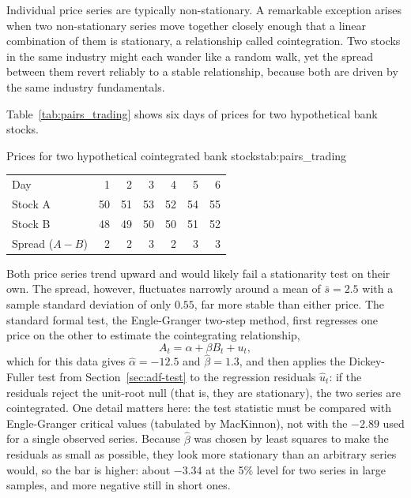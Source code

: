 \documentclass[../ai_in_finance]{subfiles}
\begin{document}
Individual price series are typically non-stationary. A remarkable exception arises when two non-stationary series move together closely enough that a linear combination of them is stationary, a relationship called cointegration. Two stocks in the same industry might each wander like a random walk, yet the spread between them revert reliably to a stable relationship, because both are driven by the same industry fundamentals.

Table~\ref{tab:pairs_trading} shows six days of prices for two hypothetical bank stocks.

\begin{booktable}[htbp]{Prices for two hypothetical cointegrated bank stocks}{tab:pairs_trading}
\begin{tabular}{lrrrrrr}
\toprule
Day & 1 & 2 & 3 & 4 & 5 & 6 \\
Stock A & 50 & 51 & 53 & 52 & 54 & 55 \\
Stock B & 48 & 49 & 50 & 50 & 51 & 52 \\
Spread ($A-B$) & 2 & 2 & 3 & 2 & 3 & 3 \\
\bottomrule
\end{tabular}
\end{booktable}

Both price series trend upward and would likely fail a stationarity test on their own. The spread, however, fluctuates narrowly around a mean of $\bar{s} = 2.5$ with a sample standard deviation of only $0.55$, far more stable than either price. The standard formal test, the Engle-Granger two-step method, first regresses one price on the other to estimate the cointegrating relationship,
\begin{equation*}
A_t = \alpha + \beta B_t + u_t,
\end{equation*}
which for this data gives $\hat\alpha = -12.5$ and $\hat\beta = 1.3$, and then applies the Dickey-Fuller test from Section~\ref{sec:adf-test} to the regression residuals $\hat u_t$: if the residuals reject the unit-root null (that is, they are stationary), the two series are cointegrated. One detail matters here: the test statistic must be compared with Engle-Granger critical values (tabulated by MacKinnon), not with the $-2.89$ used for a single observed series. Because $\hat\beta$ was chosen by least squares to make the residuals as small as possible, they look more stationary than an arbitrary series would, so the bar is higher: about $-3.34$ at the 5\% level for two series in large samples, and more negative still in short ones.
\end{document}
